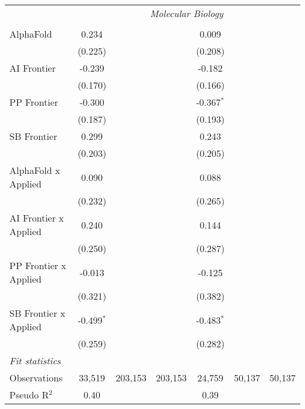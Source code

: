 \begin{tabular}{lcccccc}
 & \multicolumn{6}{c}{\textit{Molecular Biology}} \\ \\
   AlphaFold             & 0.234        &         &         & 0.009        &        &   \\   
                         & (0.225)      &         &         & (0.208)      &        &   \\   
   AI Frontier           & -0.239       &         &         & -0.182       &        &   \\   
                         & (0.170)      &         &         & (0.166)      &        &   \\   
   PP Frontier           & -0.300       &         &         & -0.367$^{*}$ &        &   \\   
                         & (0.187)      &         &         & (0.193)      &        &   \\   
   SB Frontier           & 0.299        &         &         & 0.243        &        &   \\   
                         & (0.203)      &         &         & (0.205)      &        &   \\   
   AlphaFold x Applied   & 0.090        &         &         & 0.088        &        &   \\   
                         & (0.232)      &         &         & (0.265)      &        &   \\   
   AI Frontier x Applied & 0.240        &         &         & 0.144        &        &   \\   
                         & (0.250)      &         &         & (0.287)      &        &   \\   
   PP Frontier x Applied & -0.013       &         &         & -0.125       &        &   \\   
                         & (0.321)      &         &         & (0.382)      &        &   \\   
   SB Frontier x Applied & -0.499$^{*}$ &         &         & -0.483$^{*}$ &        &   \\   
                         & (0.259)      &         &         & (0.282)      &        &   \\   
   \midrule
   \emph{Fit statistics}\\
   Observations          & 33,519       & 203,153 & 203,153 & 24,759       & 50,137 & 50,137\\  
   Pseudo R$^2$          & 0.40         &         &         & 0.39         &        & \\  
   

\end{tabular}
